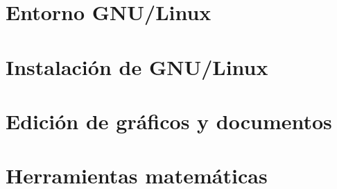 %


\part{Entorno GNU/Linux}







\part{Instalación de GNU/Linux}




\part{Edición de gráficos y documentos}

%




\part{Herramientas matemáticas}





